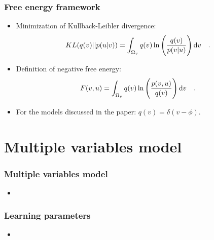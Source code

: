 \documentclass[aspectratio=43]{beamer}
\begin{document}
\begin{frame}
  \frametitle{Free energy framework}
  \begin{itemize}
    \item<1-> Minimization of Kullback-Leibler divergence:
      \begin{equation}
        \label{eq:kl_divergence}
        KL(q(v) || p(u | v)) = \int_{\Omega_v} q(v) \ln \Bigg( \frac{q(v)}{p(v | u)} \Bigg) \odif{v}
        \quad .
      \end{equation}
    \item<2-> Definition of negative free energy:
    \begin{equation}
      \label{eq:negative_free_energy_definition}
      F(v, u) = \int_{\Omega_v} q(v) \ln \Bigg( \frac{p(v, u)}{q(v)} \Bigg) \odif{v}
      \quad .
    \end{equation}
    \item<3-> For the models discussed in the paper: $q(v) = \delta(v - \phi)$.
  \end{itemize}
\end{frame}



\section{Multiple variables model}
\begin{frame}
  \frametitle{Multiple variables model}
  \begin{itemize}
    \item %
  \end{itemize}
\end{frame}

\begin{frame}
  \frametitle{Learning parameters}
  \begin{itemize}
    \item %
  \end{itemize}
\end{frame}
\end{document}
